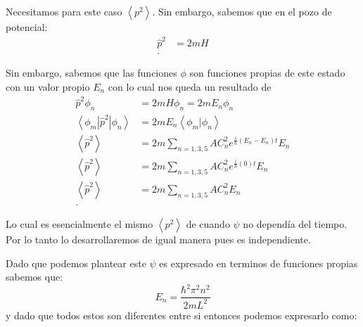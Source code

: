 \documentclass{report}
\begin{document}
Necesitamos para este caso $\left< p^2 \right>$. Sin embargo, sabemos que en el pozo de potencial:
\begin{align*}
  \hat{p}^2 &= 2m H\\
.\end{align*}

Sin embargo, sabemos que las funciones $\phi$ son funciones propias de este estado con un valor propio $E_n$ con lo cual nos queda un resultado de
\begin{align*}
  \hat{p}^2 \phi_n &= 2m H \phi_n = 2m E_n \phi_n\\
  \left< \phi_m \right| \hat{p}^2 \left| \phi_n \right> &= 2m E_n \left<\phi_m | \phi_n \right> \\
  \left< \hat{p}^2\right> &= 2m  \sum_{n=1,3,5} A C_n^2 e^{\frac{i}{\hbar}\left( E_n - E_n \right)t }E_n \\
  \left< \hat{p}^2\right> &= 2m  \sum_{n=1,3,5} A C_n^2 e^{\frac{i}{\hbar}\left( 0 \right)t }E_n \\
  \left< \hat{p}^2\right> &= 2m  \sum_{n=1,3,5} A C_n^2 E_n \\
.\end{align*}

Lo cual es esencialmente el mismo $\left<p^2 \right>$ de cuando $\psi$ no dependía del tiempo. Por lo tanto lo desarrollaremos de igual manera pues es independiente.

Dado que podemos plantear este $\psi$ es expresado en terminos de funciones propias sabemos que: \[E_n = \frac{\hbar^2\pi^2n^2}{2mL^2}\] y dado que todos estos son diferentes entre si entonces podemos expresarlo como:
\end{document}

